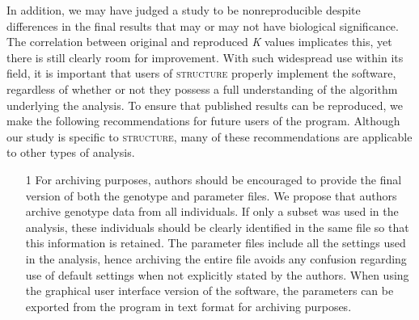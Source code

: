 In addition, we may have judged a study to be nonreproducible despite differences in the final results 
that may or may not have biological significance. The correlation between original and reproduced 
\emph{K} values implicates this, yet there is still clearly room for improvement. With such widespread 
use within its field, it is important that users of \textsc{structure} properly implement the software, 
regardless of whether or not they possess a full understanding of the algorithm underlying the analysis. 
To ensure that published results can be reproduced, we make the following recommendations for future users 
of the program. Although our study is specific to \textsc{structure}, many of these recommendations are 
applicable to other types of analysis.

\begin{itemize}
\item[1] For archiving purposes, authors should be encouraged to provide the final version of both the genotype 
and parameter files. We propose that authors archive genotype data from all individuals. If only a subset 
was used in the analysis, these individuals should be clearly identified in the same file so that this 
information is retained. The parameter files include all the settings used in the analysis, hence 
archiving the entire file avoids any confusion regarding use of default settings when not explicitly 
stated by the authors. When using the graphical user interface version of the software, the parameters 
can be exported from the program in text format for archiving purposes.


\end{itemize}
